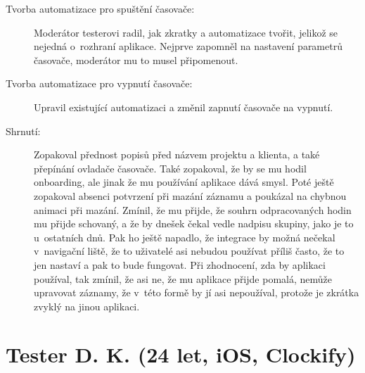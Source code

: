 \begin{description}
\item[Tvorba automatizace pro spuštění časovače:] Moderátor testerovi radil, jak zkratky a automatizace tvořit, jelikož se nejedná o~rozhraní aplikace. Nejprve zapomněl na nastavení parametrů časovače, moderátor mu to musel připomenout.
\item[Tvorba automatizace pro vypnutí časovače:] Upravil existující automatizaci a změnil zapnutí časovače na vypnutí.
\item[Shrnutí:] Zopakoval přednost popisů před názvem projektu a klienta, a také přepínání ovladače časovače. Také zopakoval, že by se mu hodil onboarding, ale jinak že mu používání aplikace dává smysl. Poté ještě zopakoval absenci potvrzení při mazání záznamu a poukázal na chybnou animaci při mazání. Zmínil, že mu přijde, že souhrn odpracovaných hodin mu přijde schovaný, a že by dnešek čekal vedle nadpisu skupiny, jako je to u~ostatních dnů. Pak ho ještě napadlo, že integrace by možná nečekal v~navigační liště, že to uživatelé asi nebudou používat příliš často, že to jen nastaví a pak to bude fungovat. Při zhodnocení, zda by aplikaci používal, tak zmínil, že asi ne, že mu aplikace přijde pomalá, nemůže upravovat záznamy, že v~této formě by jí asi nepoužíval, protože je zkrátka zvyklý na jinou aplikaci.
\end{description}

\section[Tester D. K.]{Tester D. K. (24 let, iOS, Clockify)}


